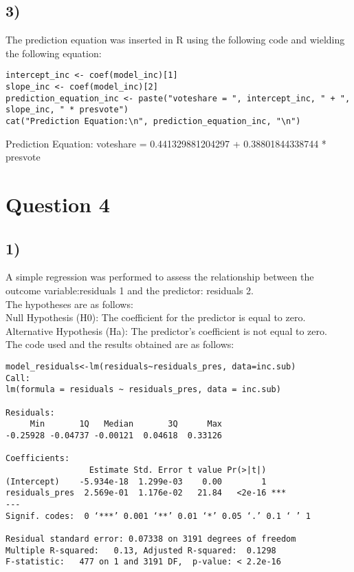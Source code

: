 \documentclass[oneside]{article}
\begin{document}
\subsection*{3)}
The prediction equation was inserted in R using the following code and wielding the following equation:
\begin{verbatim}
intercept_inc <- coef(model_inc)[1]
slope_inc <- coef(model_inc)[2]
prediction_equation_inc <- paste("voteshare = ", intercept_inc, " + ", slope_inc, " * presvote")
cat("Prediction Equation:\n", prediction_equation_inc, "\n")

\end{verbatim}
Prediction Equation:
 voteshare =  0.441329881204297  +  0.38801844338744  * presvote

\section*{Question 4}
\subsection*{1)}
A simple regression was performed to assess the relationship between the outcome variable:residuals 1  and the predictor: residuals 2.
\\
The hypotheses are as follows:\\
Null Hypothesis (H0): The coefficient for the predictor is equal to zero.\\
Alternative Hypothesis (Ha): The predictor's coefficient is not equal to zero.
\\
The code used and the results obtained are as follows:
\begin{verbatim}
model_residuals<-lm(residuals~residuals_pres, data=inc.sub)
Call:
lm(formula = residuals ~ residuals_pres, data = inc.sub)

Residuals:
     Min       1Q   Median       3Q      Max 
-0.25928 -0.04737 -0.00121  0.04618  0.33126 

Coefficients:
                 Estimate Std. Error t value Pr(>|t|)    
(Intercept)    -5.934e-18  1.299e-03    0.00        1    
residuals_pres  2.569e-01  1.176e-02   21.84   <2e-16 ***
---
Signif. codes:  0 ‘***’ 0.001 ‘**’ 0.01 ‘*’ 0.05 ‘.’ 0.1 ‘ ’ 1

Residual standard error: 0.07338 on 3191 degrees of freedom
Multiple R-squared:   0.13,	Adjusted R-squared:  0.1298 
F-statistic:   477 on 1 and 3191 DF,  p-value: < 2.2e-16
\end{verbatim}
\end{document}
